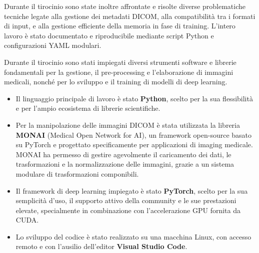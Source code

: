 \documentclass[minted, draw]{../tex/hebdomon}
\begin{document}
Durante il tirocinio sono state inoltre affrontate e risolte diverse problematiche tecniche legate alla gestione dei metadati DICOM, alla compatibilità tra i formati di input, e alla gestione efficiente della memoria in fase di training. L'intero lavoro è stato documentato e riproducibile mediante script Python e configurazioni YAML modulari.




%
% 	

	
Durante il tirocinio sono stati impiegati diversi strumenti software e librerie  fondamentali per la gestione, il pre-processing e l'elaborazione di immagini medicali, nonché per lo sviluppo e il training di modelli di deep learning.
\begin{itemize}
	\item  Il linguaggio principale di lavoro è stato \textbf{Python}, scelto per la sua flessibilità e per l'ampio ecosistema di librerie scientifiche.
	\item Per la manipolazione delle immagini DICOM è stata utilizzata la libreria \textbf{MONAI} (Medical Open Network for AI), un framework open-source basato su PyTorch e progettato specificamente per applicazioni di imaging medicale. MONAI ha permesso di gestire agevolmente il caricamento dei dati, le trasformazioni e la normalizzazione delle immagini, grazie a un sistema modulare di trasformazioni componibili.
	\item Il framework di deep learning impiegato è stato \textbf{PyTorch}, scelto per la sua semplicità d'uso, il supporto attivo della community e le sue prestazioni elevate, specialmente in combinazione con l'accelerazione GPU fornita da CUDA.
	\item Lo sviluppo del codice è stato realizzato su una macchina Linux, con accesso remoto e con l'ausilio dell'editor \textbf{Visual Studio Code}.
\end{itemize}
\end{document}
